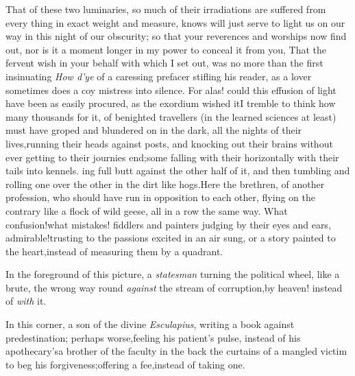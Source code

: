 \documentclass{article}
\begin{document}
That of these two luminaries, so much of their irradiations are
suffered from
every thing in exact weight and
measure, knows will just serve to light us on our way in this night
of our obscurity; so that your reverences and worships now find
out, nor is it a moment longer in my power to conceal it from you,
That the fervent wish in your behalf with which I set out, was no
more than the first insinuating \textit{How d’ye} of a
caressing prefacer stifling his reader, as a lover sometimes does
a coy mistress into silence. For alas! could this effusion of
light have been as easily procured, as the exordium wished it\tsk I tremble to think how many
thousands for it, of benighted travellers (in the learned sciences
at least) must have groped and blundered on in the dark, all the
nights of their lives,\tsh running their heads against
posts, and knocking out
their brains without ever getting to their
journies end;\tsk some falling with their 
 horizontally with
their tails into kennels.\break
{}
ing full butt against the other half of it, and then tumbling
and rolling one over the other in the dirt like hogs.\tsk Here
the brethren, of another profession, who should have run in
opposition to each other, flying on the contrary like a flock of
wild geese, all in a row the same way.\break
\tsk What confusion!\tsk what mistakes!\break
\tsh fiddlers and painters judging by their eyes and ears,\tsk
admirable!\tsk trusting to the passions excited in an air
sung, or a story painted to the heart,\tsk instead of measuring
them by a quadrant.

In the foreground of this picture, a \textit{statesman} turning
the political wheel, like a brute, the wrong way round\tsh
\textit{against} the stream of corruption,\tsk by heaven!\tsh
instead of \textit{with} it.

In this corner, a son of the divine \textit{Esculapius}, writing a
book against predestination; perhaps worse,\tsk feeling his
patient’s pulse, instead of his
apothecary’s\break\tsk a brother of the faculty in the
back  the curtains of a
mangled victim to beg his forgiveness;\tsk offering a
fee,\tsk instead of taking one.
\end{document}
